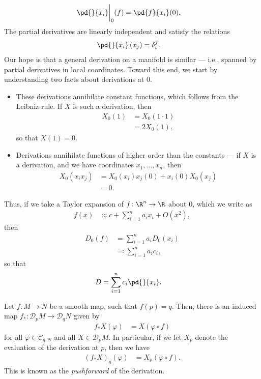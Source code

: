 \documentclass[10pt]{mypackage}
\begin{document}
\begin{align*}
  \pd{}{x_i}\biggr\vert_{0}(f) &= \pd{f}{x_i}(0).
\end{align*}
The partial derivatives are linearly independent and satisfy the relations
\begin{align*}
  \pd{}{x_i} \left( x_j \right) &= \delta_{i}^{j}.
\end{align*}
Our hope is that a general derivation on a manifold is similar --- i.e., spanned by partial derivatives in local coordinates. Toward this end, we start by understanding two facts about derivations at $0$.
\begin{itemize}
  \item These derivations annihilate constant functions, which follows from the Leibniz rule. If $X$ is such a derivation, then
    \begin{align*}
      X_0\left( 1 \right) &= X_0\left( 1\cdot 1 \right)\\
                        &= 2X_0(1),
    \end{align*}
    so that $X(1) = 0$.
  \item Derivations annihilate functions of higher order than the constants --- if $X$ is a derivation, and we have coordinates $x_1,\dots,x_n$, then
    \begin{align*}
      X_0\left( x_ix_j \right) &= X_0\left( x_i \right)x_j\left( 0 \right) + x_i(0)X_0\left( x_j \right)\\
                               &= 0.
    \end{align*}
\end{itemize}
Thus, if we take a Taylor expansion of $f\colon \R^{n}\rightarrow \R$ about $0$, which we write as
\begin{align*}
  f(x) &\approx c + \sum_{i=1}^{n}a_ix_i + O\left( x^2 \right),
\end{align*}
then
\begin{align*}
  D_0(f) &= \sum_{i=1}^{n}a_i D_0\left( x_i \right)\\
         &\eqcolon \sum_{i=1}^{n}a_ic_i,
\end{align*}
so that
\begin{align*}
  D &= \sum_{i=1}^{n}c_i \pd{}{x_i}.
\end{align*}
\begin{definition}
  Let $f\colon M\rightarrow N$ be a smooth map, such that $f(p) = q$. Then, there is an induced map $f_{\ast}\colon \mathcal{D}_pM\rightarrow \mathcal{D}_qN$ given by
  \begin{align*}
    f_{\ast}X\left( \varphi \right) &= X\left( \varphi\circ f \right)
  \end{align*}
  for all $\varphi\in \mathcal{C}_{q,N}$ and all $X\in \mathcal{D}_pM$. In particular, if we let $X_p$ denote the evaluation of the derivation at $p$, then we have
  \begin{align*}
    \left( f_{\ast}X \right)_{q}\left( \varphi \right) &= X_p\left( \varphi\circ f \right).
  \end{align*}
  This is known as the \textit{pushforward} of the derivation.
\end{definition}
\end{document}
